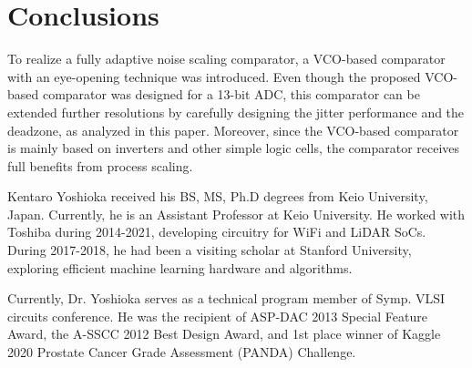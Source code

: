 \documentclass[journal]{IEEEtran}
\begin{document}
\section{Conclusions}
To realize a fully adaptive noise scaling comparator, a VCO-based comparator with an eye-opening technique was introduced.  Even though the proposed VCO-based comparator was designed for a 13-bit ADC, this comparator can be extended further resolutions by carefully designing the jitter performance and the deadzone, as analyzed in this paper. Moreover, since the VCO-based comparator is mainly based on inverters and other simple logic cells, the comparator receives full benefits from process scaling. %





\begin{IEEEbiography}
{Kentaro Yoshioka}
received his BS, MS, Ph.D degrees from Keio University, Japan. Currently, he is an Assistant Professor at Keio University. He worked with Toshiba during 2014-2021, developing circuitry for WiFi and LiDAR SoCs. During 2017-2018, he had been a visiting scholar at Stanford University, exploring efficient machine learning hardware and algorithms. 

Currently, Dr. Yoshioka serves as a technical program member of Symp. VLSI circuits conference. He was the recipient of ASP-DAC 2013 Special Feature Award, the A-SSCC 2012 Best Design Award, and 1st place winner of Kaggle 2020 Prostate Cancer Grade Assessment (PANDA) Challenge.
\end{IEEEbiography}
\end{document}
